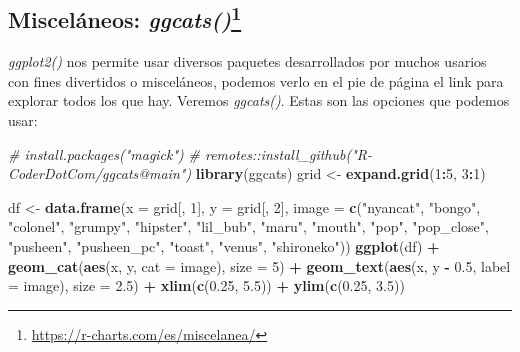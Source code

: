 \documentclass[
]{book}
\newenvironment{Shaded}{\begin{snugshade}}{\end{snugshade}}
\newcommand{\AttributeTok}[1]{\textcolor[rgb]{0.13,0.29,0.53}{#1}}
\newcommand{\CommentTok}[1]{\textcolor[rgb]{0.56,0.35,0.01}{\textit{#1}}}
\newcommand{\DecValTok}[1]{\textcolor[rgb]{0.00,0.00,0.81}{#1}}
\newcommand{\FloatTok}[1]{\textcolor[rgb]{0.00,0.00,0.81}{#1}}
\newcommand{\FunctionTok}[1]{\textcolor[rgb]{0.13,0.29,0.53}{\textbf{#1}}}
\newcommand{\NormalTok}[1]{#1}
\newcommand{\OtherTok}[1]{\textcolor[rgb]{0.56,0.35,0.01}{#1}}
\newcommand{\SpecialCharTok}[1]{\textcolor[rgb]{0.81,0.36,0.00}{\textbf{#1}}}
\newcommand{\StringTok}[1]{\textcolor[rgb]{0.31,0.60,0.02}{#1}}
\begin{document}
\newpage

\subsection[Misceláneos: \emph{ggcats()}]{\texorpdfstring{Misceláneos: \emph{ggcats()}\footnote{\url{https://r-charts.com/es/miscelanea/}}}{Misceláneos: ggcats()}}\label{misceluxe1neos-ggcats4}

\emph{ggplot2()} nos permite usar diversos paquetes desarrollados por muchos usarios con fines divertidos o misceláneos, podemos verlo en el pie de página el link para explorar todos los que hay.
Veremos \emph{ggcats()}.
Estas son las opciones que podemos usar:

\begin{Shaded}
\begin{Highlighting}[]
\CommentTok{\# install.packages("magick")}
\CommentTok{\# remotes::install\_github("R{-}CoderDotCom/ggcats@main")}
\FunctionTok{library}\NormalTok{(ggcats)}
\NormalTok{grid }\OtherTok{\textless{}{-}} \FunctionTok{expand.grid}\NormalTok{(}\DecValTok{1}\SpecialCharTok{:}\DecValTok{5}\NormalTok{, }\DecValTok{3}\SpecialCharTok{:}\DecValTok{1}\NormalTok{)}

\NormalTok{df }\OtherTok{\textless{}{-}} \FunctionTok{data.frame}\NormalTok{(}\AttributeTok{x =}\NormalTok{ grid[, }\DecValTok{1}\NormalTok{],}
                 \AttributeTok{y =}\NormalTok{ grid[, }\DecValTok{2}\NormalTok{],}
                 \AttributeTok{image =} \FunctionTok{c}\NormalTok{(}\StringTok{"nyancat"}\NormalTok{, }\StringTok{"bongo"}\NormalTok{,}
                           \StringTok{"colonel"}\NormalTok{, }\StringTok{"grumpy"}\NormalTok{,}
                           \StringTok{"hipster"}\NormalTok{, }\StringTok{"lil\_bub"}\NormalTok{,}
                           \StringTok{"maru"}\NormalTok{, }\StringTok{"mouth"}\NormalTok{,}
                           \StringTok{"pop"}\NormalTok{, }\StringTok{"pop\_close"}\NormalTok{, }
                           \StringTok{"pusheen"}\NormalTok{, }\StringTok{"pusheen\_pc"}\NormalTok{,}
                           \StringTok{"toast"}\NormalTok{, }\StringTok{"venus"}\NormalTok{,}
                           \StringTok{"shironeko"}\NormalTok{))}
\FunctionTok{ggplot}\NormalTok{(df) }\SpecialCharTok{+}
 \FunctionTok{geom\_cat}\NormalTok{(}\FunctionTok{aes}\NormalTok{(x, y, }\AttributeTok{cat =}\NormalTok{ image), }\AttributeTok{size =} \DecValTok{5}\NormalTok{) }\SpecialCharTok{+}
    \FunctionTok{geom\_text}\NormalTok{(}\FunctionTok{aes}\NormalTok{(x, y }\SpecialCharTok{{-}} \FloatTok{0.5}\NormalTok{, }\AttributeTok{label =}\NormalTok{ image), }\AttributeTok{size =} \FloatTok{2.5}\NormalTok{) }\SpecialCharTok{+}
    \FunctionTok{xlim}\NormalTok{(}\FunctionTok{c}\NormalTok{(}\FloatTok{0.25}\NormalTok{, }\FloatTok{5.5}\NormalTok{)) }\SpecialCharTok{+} 
    \FunctionTok{ylim}\NormalTok{(}\FunctionTok{c}\NormalTok{(}\FloatTok{0.25}\NormalTok{, }\FloatTok{3.5}\NormalTok{))}
\end{Highlighting}
\end{Shaded}
\end{document}
